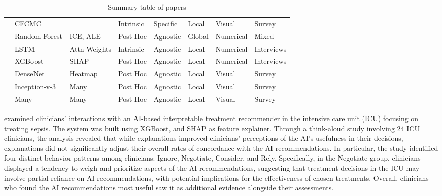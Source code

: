 \begin{table*}
\begin{tabular}{|l|l|lllll|l|}
        \cite{sabol2020explainable} & CFCMC &  & Intrinsic & Specific & Local & Visual & Survey  \\ 
        
        \cite{rajashekar2024human} & Random Forest & ICE, ALE & Post Hoc & Agnostic & Global & Numerical & Mixed  \\
        
        \cite{zhang2024rethinking} & LSTM & Attn Weights & Intrinsic & Agnostic & Local & Numerical & Interviews  \\ 
        
        \cite{kim2022prediction}  & XGBoost & SHAP & Post Hoc & Agnostic & Local & Numerical & Interviews  \\
        
        \cite{pumplun2023bringing} & DenseNet & Heatmap & Post Hoc & Agnostic & Local & Visual & Survey  \\ 

        \cite{singh2021evaluation} & Inception-v-3 & Many & Post Hoc & Agnostic & Local & Visual & Survey \\

        \cite{neves2021interpretable} & Many & Many & Post Hoc & Agnostic & Local & Visual & Survey \\
        
        \hline
    \end{tabular}
    \caption{Summary table of papers}
    \label{tab:plain}
\end{table*}
\fi









\cite{sivaraman2023ignore} examined clinicians' interactions with an AI-based interpretable treatment recommender in the intensive care unit (ICU) focusing on treating sepsis. The system was built using XGBoost, and SHAP as feature explainer. 
Through a think-aloud study involving 24 ICU clinicians, the analysis revealed that while explanations improved clinicians' perceptions of the AI's usefulness in their decisions, explanations did not significantly adjust their overall rates of concordance with the AI recommendations. In particular, the study identified four distinct behavior patterns among clinicians: Ignore, Negotiate, Consider, and Rely. Specifically, in the Negotiate group, clinicians displayed a tendency to weigh and prioritize aspects of the AI recommendations, suggesting that treatment decisions in the ICU may involve partial reliance on AI recommendations, with potential implications for the effectiveness of chosen treatments. Overall, clinicians who found the AI recommendations most useful saw it as additional evidence alongside their assessments.


